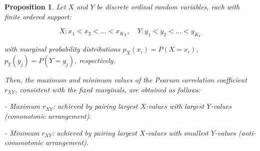\documentclass[
  12pt,
]{article}
\theoremstyle{plain}
\newtheorem{proposition}[theorem]{Proposition}
\theoremstyle{definition}
\theoremstyle{remark}
\begin{document}
\label{prop-max-product}
\begin{proposition}

Let $X$ and $Y$ be discrete ordinal random variables, each with finite ordered support:

$$
X: x_1 < x_2 < \dots < x_{K_X},\quad Y: y_1 < y_2 < \dots < y_{K_Y}
$$

with marginal probability distributions $p_X(x_i) = P(X = x_i)$, $p_Y(y_j) = P(Y = y_j)$, respectively.

Then, the maximum and minimum values of the Pearson correlation coefficient $r_{XY}$, consistent with the fixed marginals, are obtained as follows:

- Maximum $r_{XY}$: achieved by pairing largest $X$-values with largest $Y$-values (comonotonic arrangement).
    
- Minimum $r_{XY}$: achieved by pairing largest $X$-values with smallest $Y$-values (anti-comonotonic arrangement).
\end{proposition}
\end{document}
